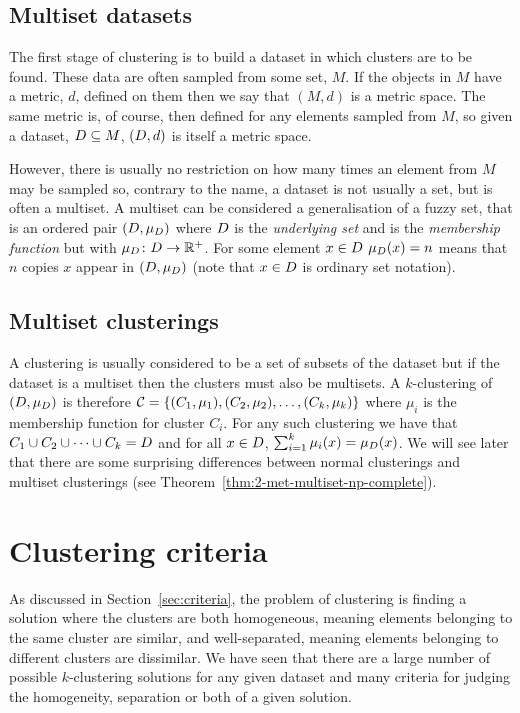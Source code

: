 \subsection{Multiset datasets}
\label{sec:datasets}

The first stage of clustering is to build a dataset in which clusters are to
be found.  These data are often sampled from some set, $M$.  If the objects in
$M$ have a metric, $d$, defined on them then we say that $(M,d)$ is a metric
space.  The same metric is, of course, then defined for any elements sampled
from $M$, so given a dataset, $D \subseteq M$, $(D,d)$ is itself a
metric space.

However, there is usually no restriction on how many times an element from $M$
may be sampled so, contrary to the name, a dataset is not usually a set, but
is often a multiset.  A multiset can be considered a generalisation of a fuzzy
set, that is an ordered pair $(D,\mu_{D})$ where $D$ is the
\textit{underlying set} and is the \textit{membership function} but with
$\mu_{D} \colon D \to \mathbb{R}^+$.  For some element $x \in D$
$\mu_{D}(x) = n$ means that $n$ copies $x$ appear in $(D,\mu_{D})$
(note that $x \in D$ is ordinary set notation).

\subsection{Multiset clusterings}
\label{sec:multiset-clusterings}

A clustering is usually considered to be a set of subsets of the dataset but
if the dataset is a multiset then the clusters must also be multisets.  A
$k$-clustering of $(D,\mu_{D})$ is therefore $\mathcal{C} =
\{(C_{1},\mu_{1}),(C_{2},\mu_{2}),\dotsc,(C_{k},\mu_{k})\}$ where $\mu_i$ is
the membership function for cluster $C_i$.  For any such clustering we have
that $C_{1} \cup C_{2} \cup \dotsb \cup C_{k} = D$ and for all $x \in
D$, $\sum_{i=1}^{k} \mu_{i}(x) = \mu_{D}(x)$.  We will see later that
there are some surprising differences between normal clusterings and multiset
clusterings (see Theorem~\ref{thm:2-met-multiset-np-complete}).

\section{Clustering criteria}
\label{sec:clustering-criteria}

As discussed in Section~\ref{sec:criteria}, the problem of clustering is
finding a solution where the clusters are both homogeneous, meaning elements
belonging to the same cluster are similar, and well-separated, meaning
elements belonging to different clusters are dissimilar.  We have seen that
there are a large number of possible $k$-clustering solutions for any given
dataset and many criteria for judging the homogeneity, separation or both of a
given solution.

